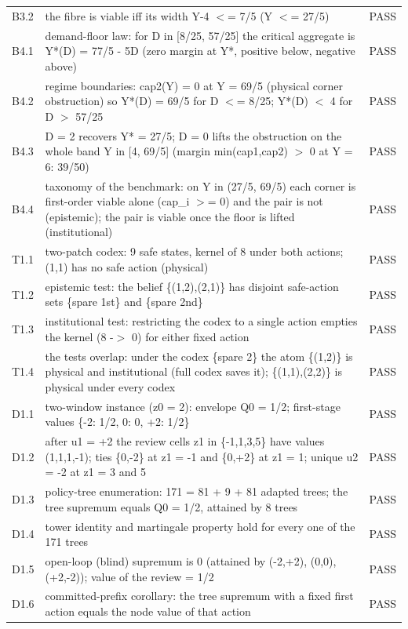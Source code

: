 \documentclass[11pt,a4paper]{article}
\theoremstyle{plain}
\theoremstyle{definition}
\theoremstyle{remark}
\begin{document}
\begin{footnotesize}
\begin{longtable}{p{1.1cm}p{12.6cm}p{0.9cm}}
B3.2 & the fibre is viable iff its width Y-4 $<$= 7/5 (Y $<$= 27/5) & PASS\\
B4.1 & demand-floor law: for D in [8/25, 57/25] the critical aggregate is Y*(D) = 77/5 - 5D (zero margin at Y*, positive below, negative above) & PASS\\
B4.2 & regime boundaries: cap2(Y) = 0 at Y = 69/5 (physical corner obstruction) so Y*(D) = 69/5 for D $<$= 8/25; Y*(D) $<$ 4 for D $>$ 57/25 & PASS\\
B4.3 & D = 2 recovers Y* = 27/5; D = 0 lifts the obstruction on the whole band Y in [4, 69/5] (margin min(cap1,cap2) $>$ 0 at Y = 6: 39/50) & PASS\\
B4.4 & taxonomy of the benchmark: on Y in (27/5, 69/5) each corner is first-order viable alone (cap\_i $>$= 0) and the pair is not (epistemic); the pair is viable once the floor is lifted (institutional) & PASS\\
T1.1 & two-patch codex: 9 safe states, kernel of 8 under both actions; (1,1) has no safe action (physical) & PASS\\
T1.2 & epistemic test: the belief \{(1,2),(2,1)\} has disjoint safe-action sets \{spare 1st\} and \{spare 2nd\} & PASS\\
T1.3 & institutional test: restricting the codex to a single action empties the kernel (8 -$>$ 0) for either fixed action & PASS\\
T1.4 & the tests overlap: under the codex \{spare 2\} the atom \{(1,2)\} is physical and institutional (full codex saves it); \{(1,1),(2,2)\} is physical under every codex & PASS\\
D1.1 & two-window instance (z0 = 2): envelope Q0 = 1/2; first-stage values \{-2: 1/2, 0: 0, +2: 1/2\} & PASS\\
D1.2 & after u1 = +2 the review cells z1 in \{-1,1,3,5\} have values (1,1,1,-1); ties \{0,-2\} at z1 = -1 and \{0,+2\} at z1 = 1; unique u2 = -2 at z1 = 3 and 5 & PASS\\
D1.3 & policy-tree enumeration: 171 = 81 + 9 + 81 adapted trees; the tree supremum equals Q0 = 1/2, attained by 8 trees & PASS\\
D1.4 & tower identity and martingale property hold for every one of the 171 trees & PASS\\
D1.5 & open-loop (blind) supremum is 0 (attained by (-2,+2), (0,0), (+2,-2)); value of the review = 1/2 & PASS\\
D1.6 & committed-prefix corollary: the tree supremum with a fixed first action equals the node value of that action & PASS\\

\end{longtable}
\end{footnotesize}
\end{document}
